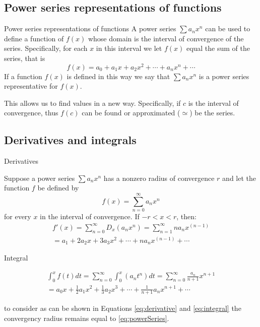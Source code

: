\documentclass[newPxFont]{beamer}
\begin{document}
\subsection{Power series representations of functions}
\begin{frame}{Power series representations of functions}
  A \alert{power series} $\sum a_nx^n$ can be used to define a function of $f(x)$ whose domain is the interval of convergence of the series. Specifically, for each $x$ in this interval we let $f(x)$ equal the sum of the series, that is
  \begin{equation}
    f(x)=a_0+a_1x+a_2x^2+\cdots+a_nx^n+\cdots
  \end{equation}
If a function $f(x)$ is defined in this way we say that $\sum a_nx^n$ is \alert{a power series representative for $f(x)$}.

\alert{This allows us to find values in a new way}. Specifically, if $c$ is the interval of convergence, thus $f(c)$ can be found  or approximated ($\simeq$) be the series.
\end{frame}
\subsection{Derivatives and integrals}
\begin{frame}{Derivatives}
  \begin{theorem}
    Suppose a power series $\sum a_nx^n$ has a nonzero radius of convergence $r$ and let the function $f$ be defined by
    \begin{equation}
      f(x)=\sum_{n=0}^{\infty}a_nx^n\label{eq:powerSeries}
    \end{equation}
for every $x$ in the interval of convergence. If $-r<x<r$, then:
    \begin{eqnarray}
      f'(x)=\sum_{n=0}^{\infty}D_x(a_nx^n)=\sum_{n=1}^\infty na_nx^{(n-1)}\label{eq:derivative}\\\nonumber
      =a_1+2a_2x+3a_3x^2+\cdots+na_nx^{(n-1)}+\cdots
    \end{eqnarray}
  \end{theorem}
\end{frame}
\begin{frame}{Integral}
\begin{theorem}
\begin{eqnarray}
  \int_0^x f(t)dt=\sum_{n=0}^{\infty}\int_0^x (a_nt^n)dt=\sum_{n=0}^\infty \frac{a_n}{n+1}x^{n+1}\label{eq:integral}\\\nonumber
  =a_0x+\frac{1}{2}a_1x^2+\frac{1}{3}a_2x^3+\cdots+\frac{1}{n+1}a_nx^{n+1}+\cdots
\end{eqnarray}
\end{theorem}
  \begin{alertblock}{to consider}
    as can be shown in Equations \eqref{eq:derivative} and \eqref{eq:integral} the convergency radius remains equal to \eqref{eq:powerSeries}.
  \end{alertblock}
\end{frame}
\end{document}
